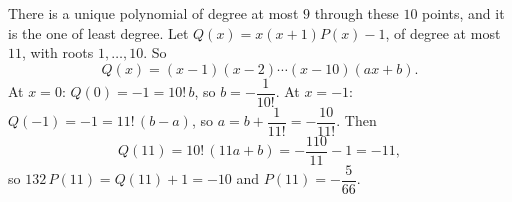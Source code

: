 There is a unique polynomial of degree at most $9$ through these $10$ points, and it is the one of least degree. Let $Q(x)=x(x+1)P(x)-1$, of degree at most $11$, with roots $1,\dots,10$. So
\[Q(x)=(x-1)(x-2)\cdots(x-10)(ax+b).\]
At $x=0$: $Q(0)=-1=10!\,b$, so $b=-\dfrac1{10!}$. At $x=-1$: $Q(-1)=-1=11!\,(b-a)$, so $a=b+\dfrac1{11!}=-\dfrac{10}{11!}$. Then
\[Q(11)=10!\,(11a+b)=-\dfrac{110}{11}-1=-11,\]
so $132\,P(11)=Q(11)+1=-10$ and $P(11)=\boxed{-\dfrac5{66}}$.
